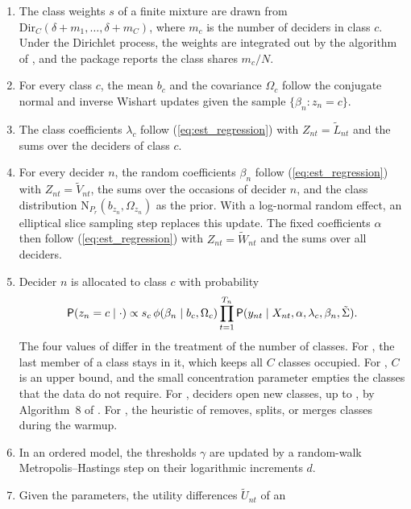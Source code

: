 \documentclass[article,shortnames]{jss}
\begin{document}
\begin{enumerate}
\item The class weights $s$ of a finite mixture are drawn from
$\mathrm{Dir}_C(\delta + m_1, \dots, \delta + m_C)$, where $m_c$ is the number
of deciders in class $c$. Under the Dirichlet process, the weights are
integrated out by the algorithm of \citet{Neal2000}, and the package reports the
class shares $m_c / N$.
\item For every class $c$, the mean $b_c$ and the covariance $\Omega_c$ follow
the conjugate normal and inverse Wishart updates given the sample $\{\beta_n :
z_n = c\}$.
\item The class coefficients $\lambda_c$ follow
(\ref{eq:est_regression}) with $Z_{nt} = \tilde{L}_{nt}$ and the sums
over the deciders of class $c$.
\item For every decider $n$, the random coefficients $\beta_n$ follow
(\ref{eq:est_regression}) with $Z_{nt} = \tilde{V}_{nt}$, the sums over
the occasions of decider $n$, and the class distribution
$\mathrm{N}_{P_r}(b_{z_n}, \Omega_{z_n})$ as the prior. With a log-normal random
effect, an elliptical slice sampling step \citep{Murray2010} replaces this
update. The fixed coefficients $\alpha$ then follow (\ref{eq:est_regression})
with $Z_{nt} = \tilde{W}_{nt}$ and the sums over all deciders.
\item Decider $n$ is allocated to class $c$ with probability
%
\begin{equation}
\label{eq:est_allocation}
\mathsf{P}(z_n = c \mid \cdot) \propto s_c\, \phi(\beta_n \mid b_c, \Omega_c)
\prod_{t = 1}^{T_n} \mathsf{P}(y_{nt} \mid X_{nt}, \alpha, \lambda_c, \beta_n,
\tilde{\Sigma}).
\end{equation}
%
The four values of  differ in the treatment of the number of
classes. For , the last member of a class stays in it, which keeps
all $C$ classes occupied. For , $C$ is an upper bound, and the
small concentration parameter empties the classes that the data do not require.
For , deciders open new classes, up to
, by Algorithm~8 of \citet{Neal2000}. For
, the heuristic of \citet{Oelschlaeger2021} removes,
splits, or merges classes during the warmup.
\item In an ordered model, the thresholds $\gamma$ are updated by a random-walk
Metropolis--Hastings step on their logarithmic increments $d$.
\item Given the parameters, the utility differences $\tilde{U}_{nt}$ of an

\end{enumerate}
\end{document}
